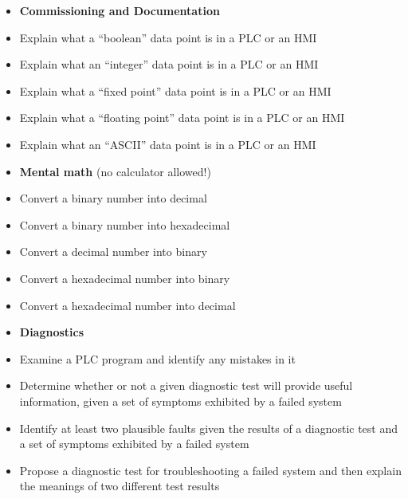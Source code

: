 \filbreak

\begin{itemize}
\item{} {\bf Commissioning and Documentation}
\item{} Explain what a ``boolean'' data point is in a PLC or an HMI 
\item{} Explain what an ``integer'' data point is in a PLC or an HMI 
\item{} Explain what a ``fixed point'' data point is in a PLC or an HMI 
\item{} Explain what a ``floating point'' data point is in a PLC or an HMI 
\item{} Explain what an  ``ASCII'' data point is in a PLC or an HMI 
\end{itemize}

\filbreak

\begin{itemize}
\item{} {\bf Mental math} (no calculator allowed!)
\item{} Convert a binary number into decimal
\item{} Convert a binary number into hexadecimal
\item{} Convert a decimal number into binary
\item{} Convert a hexadecimal number into binary
\item{} Convert a hexadecimal number into decimal
\end{itemize}

\filbreak

\begin{itemize}
\item{} {\bf Diagnostics}
\item{} Examine a PLC program and identify any mistakes in it
\item{} Determine whether or not a given diagnostic test will provide useful information, given a set of symptoms exhibited by a failed system
\item{} Identify at least two plausible faults given the results of a diagnostic test and a set of symptoms exhibited by a failed system
\item{} Propose a diagnostic test for troubleshooting a failed system and then explain the meanings of two different test results
\end{itemize}







